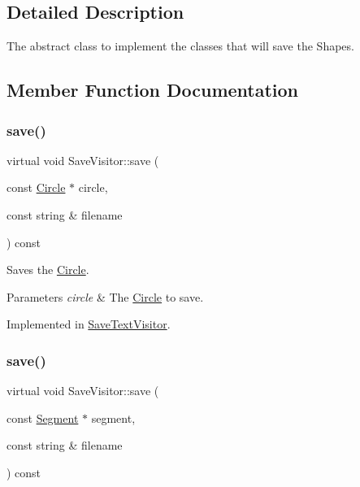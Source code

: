 \subsection{Detailed Description}
The abstract class to implement the classes that will save the Shapes. 

\subsection{Member Function Documentation}
\hypertarget{class_save_visitor_a2e17acabc377913b745edb2b391052c7}{}\label{class_save_visitor_a2e17acabc377913b745edb2b391052c7} 
\subsubsection{\texorpdfstring{save()}{save()}\hspace{0.1cm}{\footnotesize\ttfamily [1/5]}}
{\footnotesize\ttfamily virtual void Save\+Visitor\+::save (\begin{DoxyParamCaption}\item[{const \hyperlink{class_circle}{Circle} $\ast$}]{circle,  }\item[{const string \&}]{filename }\end{DoxyParamCaption}) const\hspace{0.3cm}{\ttfamily [pure virtual]}}

Saves the \hyperlink{class_circle}{Circle}. 
\begin{DoxyParams}{Parameters}
{\em circle} & The \hyperlink{class_circle}{Circle} to save. \\
\hline
\end{DoxyParams}


Implemented in \hyperlink{class_save_text_visitor_a2f083ffe6cda82e0c2fd31d601ba5e30}{Save\+Text\+Visitor}.

\hypertarget{class_save_visitor_ad23764257a2a9836cb920be85ecbcd64}{}\label{class_save_visitor_ad23764257a2a9836cb920be85ecbcd64} 
\subsubsection{\texorpdfstring{save()}{save()}\hspace{0.1cm}{\footnotesize\ttfamily [2/5]}}
{\footnotesize\ttfamily virtual void Save\+Visitor\+::save (\begin{DoxyParamCaption}\item[{const \hyperlink{class_segment}{Segment} $\ast$}]{segment,  }\item[{const string \&}]{filename }\end{DoxyParamCaption}) const\hspace{0.3cm}{\ttfamily [pure virtual]}}

